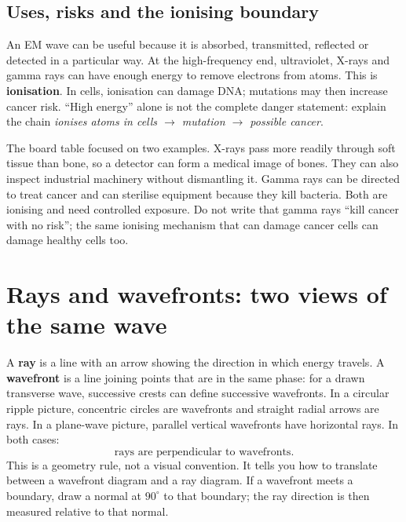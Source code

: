 \documentclass[10pt,a4paper]{article}
\begin{document}
\subsection*{Uses, risks and the ionising boundary}
An EM wave can be useful because it is absorbed, transmitted, reflected or detected in a particular way. At the high-frequency end, ultraviolet, X-rays and gamma rays can have enough energy to remove electrons from atoms. This is \textbf{ionisation}. In cells, ionisation can damage DNA; mutations may then increase cancer risk. ``High energy'' alone is not the complete danger statement: explain the chain \emph{ionises atoms in cells $\rightarrow$ mutation $\rightarrow$ possible cancer}.

The board table focused on two examples. X-rays pass more readily through soft tissue than bone, so a detector can form a medical image of bones. They can also inspect industrial machinery without dismantling it. Gamma rays can be directed to treat cancer and can sterilise equipment because they kill bacteria. Both are ionising and need controlled exposure. Do not write that gamma rays ``kill cancer with no risk''; the same ionising mechanism that can damage cancer cells can damage healthy cells too.

\section{Rays and wavefronts: two views of the same wave}
A \textbf{ray} is a line with an arrow showing the direction in which energy travels. A \textbf{wavefront} is a line joining points that are in the same phase: for a drawn transverse wave, successive crests can define successive wavefronts. In a circular ripple picture, concentric circles are wavefronts and straight radial arrows are rays. In a plane-wave picture, parallel vertical wavefronts have horizontal rays. In both cases:
\[\boxed{\text{rays are perpendicular to wavefronts}.}\]
This is a geometry rule, not a visual convention. It tells you how to translate between a wavefront diagram and a ray diagram. If a wavefront meets a boundary, draw a normal at $90^\circ$ to that boundary; the ray direction is then measured relative to that normal.

\begin{center}\end{center}
\smallskip
\end{document}
